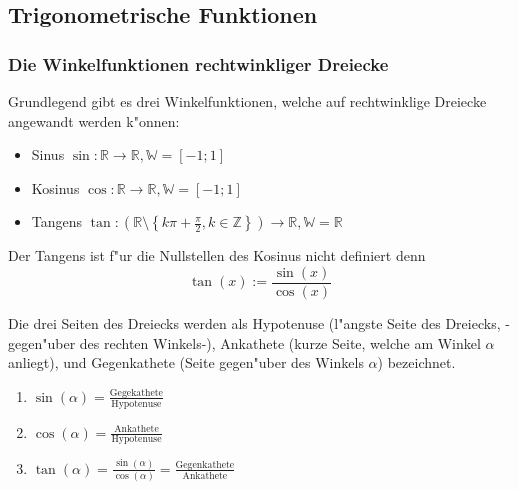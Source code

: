 \subsection{Trigonometrische Funktionen}
\subsubsection{Die Winkelfunktionen rechtwinkliger Dreiecke}
Grundlegend gibt es drei Winkelfunktionen, welche auf rechtwinklige Dreiecke angewandt werden k"onnen:
\begin{itemize}
\item Sinus $\sin : \mathbb{R} \to \mathbb{R}, \mathbb{W} = \left[-1;1 \right]$
\item Kosinus $\cos : \mathbb{R} \to \mathbb{R}, \mathbb{W} = \left[ -1;1 \right]$
\item Tangens $\tan : \left( \mathbb{R} \setminus \left\{ k \pi + \frac{\pi}{2}, k \in \mathbb{Z} \right\} \right) \to \mathbb{R}, \mathbb{W} = \mathbb{R}$
\end{itemize}
\begin{warning}
	Der Tangens ist f"ur die Nullstellen des Kosinus nicht definiert denn
	\begin{equation*}
	\tan(x) := \frac{\sin(x)}{\cos(x)}
	\end{equation*}
\end{warning}
Die drei Seiten des Dreiecks werden als Hypotenuse (l"angste Seite des Dreiecks, -gegen"uber des rechten Winkels-), Ankathete (kurze Seite, welche am Winkel $\alpha$ anliegt), und Gegenkathete (Seite gegen"uber des Winkels $\alpha$) bezeichnet.
\begin{minipage}{0.45\textwidth}
\hfill
\begin{enumerate}
\item $\sin(\alpha)=\frac{\text{Gegekathete}}{\text{Hypotenuse}}$
\item $\cos(\alpha)=\frac{\text{Ankathete}}{\text{Hypotenuse}}$
\item $\tan(\alpha)=\frac{\sin(\alpha)}{\cos(\alpha)}= \frac{\text{Gegenkathete}}{\text{Ankathete}}$
\end{enumerate}
\end{minipage}
